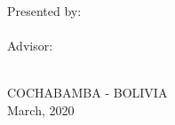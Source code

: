 \documentclass[11pt,spanish,singlespacing,headsepline]{MastersDoctoralThesis}
\begin{document}
\begin{titlepage}
\begin{center}
{\Large Presented by:}\\

\hspace{ 0.50\textwidth} \Large{\authorname}\\

\hspace{ -0.16\textwidth} {\Large Advisor:}\\

\hspace{ 0.56\textwidth} {\Large{\supname}}\\

\hspace{ 0.35\textwidth} 
\end{center}

\vspace*{0.2cm}
 
\begin{center}
\vspace*{1.5cm}
\Large{COCHABAMBA - BOLIVIA}\hspace*{1cm}\Large{\\March, 2020}	
\end{center}	
	
\end{titlepage}

\cleardoublepage

\end{document}
